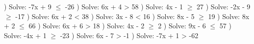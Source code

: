 \documentclass{article}%
\begin{document}
\newline%
\newline%
) Solve: -7x + 9 $\leq$ -26%
\newline%
\newline%
) Solve: 6x + 4 > 58%
\newline%
\newline%
) Solve: 4x - 1 $\geq$ 27%
\newline%
\newline%
) Solve: -2x - 9 $\geq$ -17%
\newline%
\newline%
) Solve: 6x + 2 < 38%
\newline%
\newline%
) Solve: 3x - 8 < 16%
\newline%
\newline%
) Solve: 8x - 5 $\geq$ 19%
\newline%
\newline%
) Solve: 8x + 2 $\leq$ 66%
\newline%
\newline%
) Solve: 6x + 6 > 18%
\newline%
\newline%
) Solve: 4x - 2 $\geq$ 2%
\newline%
\newline%
) Solve: 9x - 6 $\leq$ 57%
\newline%
\newline%
) Solve: -4x + 1 $\geq$ -23%
\newline%
\newline%
) Solve: 6x - 7 > -1%
\newline%
\newline%
) Solve: -7x + 1 > -62%
\newline%
\newline%
\newline%
\end{document}
